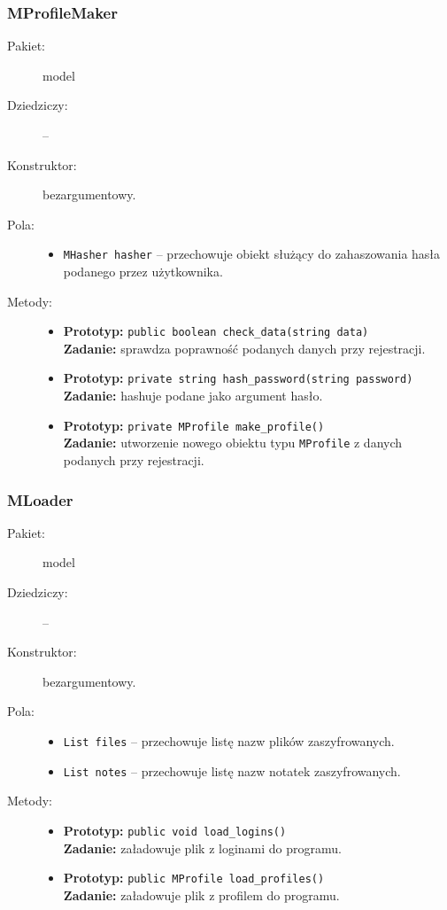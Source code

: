 \documentclass[a4paper]{article}
\newcommand{\prog}{\texttt}
\begin{document}
\subsubsection{MProfileMaker}
\begin{description}
    \item[Pakiet:] model
    \item[Dziedziczy:] --
    \item[Konstruktor:] bezargumentowy.
    \item[Pola:] \hfill
    \begin{itemize}
        \item \prog{MHasher hasher} -- przechowuje obiekt służący do zahaszowania hasła podanego przez użytkownika.
    \end{itemize}
    \item[Metody:] \hfill
    \begin{itemize}
        \item \textbf{Prototyp:} \prog{public boolean check\_data(string data)}\\\textbf{Zadanie:} sprawdza poprawność podanych danych przy rejestracji.
        \item \textbf{Prototyp:} \prog{private string hash\_password(string password)}\\\textbf{Zadanie:} hashuje podane jako argument hasło.
        \item \textbf{Prototyp:} \prog{private MProfile make\_profile()}\\\textbf{Zadanie:} utworzenie nowego obiektu typu \prog{MProfile} z danych podanych przy rejestracji.
    \end{itemize}
\end{description}

\subsubsection{MLoader}
\begin{description}
    \item[Pakiet:] model
    \item[Dziedziczy:] --
    \item[Konstruktor:] bezargumentowy.
    \item[Pola:] \hfill
    \begin{itemize}
        \item \prog{List files} -- przechowuje listę nazw plików zaszyfrowanych.
        \item \prog{List notes} -- przechowuje listę nazw notatek zaszyfrowanych.
    \end{itemize}
    \item[Metody:] \hfill
    \begin{itemize}
        \item \textbf{Prototyp:} \prog{public void load\_logins()}\\\textbf{Zadanie:} załadowuje plik z loginami do programu.
        \item \textbf{Prototyp:} \prog{public MProfile load\_profiles()}\\\textbf{Zadanie:} załadowuje plik z profilem do programu.
    \end{itemize}
\end{description}
\end{document}
